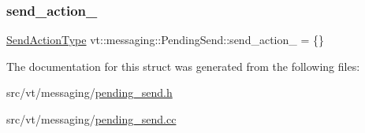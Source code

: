 \mbox{\label{structvt_1_1messaging_1_1_pending_send_a0054d2fec8353438284dc02a28a73294}} 
\subsubsection{\texorpdfstring{send\+\_\+action\+\_\+}{send\_action\_}}
{\footnotesize\ttfamily \hyperlink{structvt_1_1messaging_1_1_pending_send_aa13248a342d68230048cde8e0756851c}{Send\+Action\+Type} vt\+::messaging\+::\+Pending\+Send\+::send\+\_\+action\+\_\+ = \{\}\hspace{0.3cm}{\ttfamily [private]}}



The documentation for this struct was generated from the following files\+:\begin{DoxyCompactItemize}
\item 
src/vt/messaging/\hyperlink{pending__send_8h}{pending\+\_\+send.\+h}\item 
src/vt/messaging/\hyperlink{pending__send_8cc}{pending\+\_\+send.\+cc}\end{DoxyCompactItemize}

